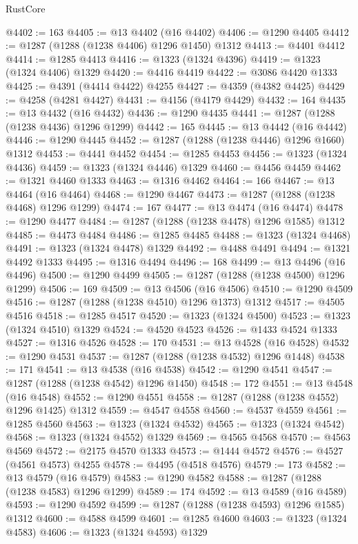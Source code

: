 \begin{lexlean}{RustCore}
\begin{coremodule}
@4402 := 163
@4405 := @13 @4402 (@16 @4402)
@4406 := @1290 @4405
@4412 := @1287 (@1288 (@1238 @4406) @1296 @1450) @1312
@4413 := @4401 @4412
@4414 := @1285 @4413
@4416 := @1323 (@1324 @4396)
@4419 := @1323 (@1324 @4406) @1329
@4420 := @4416 @4419
@4422 := @3086 @4420 @1333
@4425 := @4391 (@4414 @4422) @4255
@4427 := @4359 (@4382 @4425)
@4429 := @4258 (@4281 @4427)
@4431 := @4156 (@4179 @4429)
@4432 := 164
@4435 := @13 @4432 (@16 @4432)
@4436 := @1290 @4435
@4441 := @1287 (@1288 (@1238 @4436) @1296 @1299)
@4442 := 165
@4445 := @13 @4442 (@16 @4442)
@4446 := @1290 @4445
@4452 := @1287 (@1288 (@1238 @4446) @1296 @1660) @1312
@4453 := @4441 @4452
@4454 := @1285 @4453
@4456 := @1323 (@1324 @4436)
@4459 := @1323 (@1324 @4446) @1329
@4460 := @4456 @4459
@4462 := @1321 @4460 @1333
@4463 := @1316 @4462
@4464 := 166
@4467 := @13 @4464 (@16 @4464)
@4468 := @1290 @4467
@4473 := @1287 (@1288 (@1238 @4468) @1296 @1299)
@4474 := 167
@4477 := @13 @4474 (@16 @4474)
@4478 := @1290 @4477
@4484 := @1287 (@1288 (@1238 @4478) @1296 @1585) @1312
@4485 := @4473 @4484
@4486 := @1285 @4485
@4488 := @1323 (@1324 @4468)
@4491 := @1323 (@1324 @4478) @1329
@4492 := @4488 @4491
@4494 := @1321 @4492 @1333
@4495 := @1316 @4494
@4496 := 168
@4499 := @13 @4496 (@16 @4496)
@4500 := @1290 @4499
@4505 := @1287 (@1288 (@1238 @4500) @1296 @1299)
@4506 := 169
@4509 := @13 @4506 (@16 @4506)
@4510 := @1290 @4509
@4516 := @1287 (@1288 (@1238 @4510) @1296 @1373) @1312
@4517 := @4505 @4516
@4518 := @1285 @4517
@4520 := @1323 (@1324 @4500)
@4523 := @1323 (@1324 @4510) @1329
@4524 := @4520 @4523
@4526 := @1433 @4524 @1333
@4527 := @1316 @4526
@4528 := 170
@4531 := @13 @4528 (@16 @4528)
@4532 := @1290 @4531
@4537 := @1287 (@1288 (@1238 @4532) @1296 @1448)
@4538 := 171
@4541 := @13 @4538 (@16 @4538)
@4542 := @1290 @4541
@4547 := @1287 (@1288 (@1238 @4542) @1296 @1450)
@4548 := 172
@4551 := @13 @4548 (@16 @4548)
@4552 := @1290 @4551
@4558 := @1287 (@1288 (@1238 @4552) @1296 @1425) @1312
@4559 := @4547 @4558
@4560 := @4537 @4559
@4561 := @1285 @4560
@4563 := @1323 (@1324 @4532)
@4565 := @1323 (@1324 @4542)
@4568 := @1323 (@1324 @4552) @1329
@4569 := @4565 @4568
@4570 := @4563 @4569
@4572 := @2175 @4570 @1333
@4573 := @1444 @4572
@4576 := @4527 (@4561 @4573) @4255
@4578 := @4495 (@4518 @4576)
@4579 := 173
@4582 := @13 @4579 (@16 @4579)
@4583 := @1290 @4582
@4588 := @1287 (@1288 (@1238 @4583) @1296 @1299)
@4589 := 174
@4592 := @13 @4589 (@16 @4589)
@4593 := @1290 @4592
@4599 := @1287 (@1288 (@1238 @4593) @1296 @1585) @1312
@4600 := @4588 @4599
@4601 := @1285 @4600
@4603 := @1323 (@1324 @4583)
@4606 := @1323 (@1324 @4593) @1329

\end{coremodule}
\end{lexlean}
